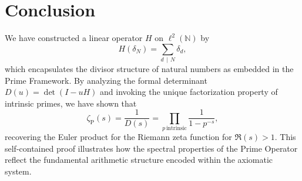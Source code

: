 \documentclass{article}
\begin{document}
\section{Conclusion}
We have constructed a linear operator \(H\) on \(\ell^2(\mathbb{N})\) by
\[
H(\delta_N)=\sum_{d\,\mid\,N} \delta_d,
\]
which encapsulates the divisor structure of natural numbers as embedded in the Prime Framework. By analyzing the formal determinant \(D(u)=\det(I-uH)\) and invoking the unique factorization property of intrinsic primes, we have shown that
\[
\zeta_{\mathrm{P}}(s) = \frac{1}{D(s)} = \prod_{p\,\text{intrinsic}} \frac{1}{1-p^{-s}},
\]
recovering the Euler product for the Riemann zeta function for \(\Re(s)>1\). This self-contained proof illustrates how the spectral properties of the Prime Operator reflect the fundamental arithmetic structure encoded within the axiomatic system.
\end{document}
